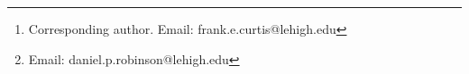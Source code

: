 \documentclass{imanum}
\begin{document}
\title{{}}

\author{{\sc Frank E. Curtis\thanks{Corresponding author. Email: frank.e.curtis@lehigh.edu}}\\[2pt]
             Department of Industrial and Systems Engineering, Lehigh University\\[6pt]
        {\sc Daniel P.~Robinson\thanks{Email: daniel.p.robinson@lehigh.edu}}\\[2pt]
             Department of Industrial and Systems Engineering, Lehigh University}

\maketitle

\begin{abstract}
  {}
  {nonlinear optimization, nonsmooth optimization, variable-metric algorithms, quasi-Newton methods, self-correcting properties of BFGS updating}
\end{abstract}






\end{document}
